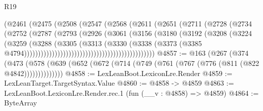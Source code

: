 \begin{lexlean}{R19}
\begin{coremodule}
                                          (@2461
                                            (@2475
                                              (@2508
                                                (@2547
                                                  (@2568
                                                    (@2611
                                                      (@2651
                                                        (@2711
                                                          (@2728
                                                            (@2734
                                                              (@2752
                                                                (@2787
                                                                  (@2793
                                                                    (@2926
                                                                      (@3061
                                                                        (@3156
                                                                          (@3180
                                                                            (@3192
                                                                              (@3208
                                                                                (@3224
                                                                                  (@3259
                                                                                    (@3288
                                                                                      (@3305
                                                                                        (@3313
                                                                                          (@3330
                                                                                            (@3338
                                                                                              (@3373
                                                                                                (@3385
                                                                                                  @4794)))))))))))))))))))))))))))))))))))))))))))))))
@4857 := @163
    (@267
      (@374
        (@473 (@578 (@639 (@652 (@672 (@714 (@749 (@761 (@767 (@776 (@811 (@822 @4842))))))))))))))
@4858 := LexLeanBoot.LexiconLre.Render
@4859 := LexLeanTarget.TargetSyntax.Value
@4860 := @4858 -> @4859
@4863 := LexLeanBoot.LexiconLre.Render.rec.{1} (fun (__v : @4858) => @4859)
@4864 := ByteArray

\end{coremodule}
\end{lexlean}
